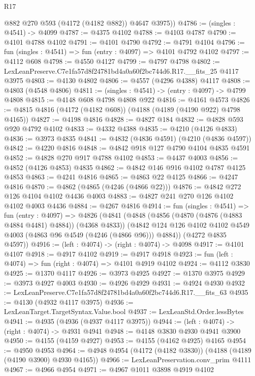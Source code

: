 \begin{lexlean}{R17}
\begin{coremodule}
        @882
        @270
        @593
        (@4172 (@4182 @882))
        @4647
        @3975))
@4786 := (singles : @4541) -> @4099
@4787 := @4375 @4102
@4788 := @4103 @4787
@4790 := @4101 @4788 @4102
@4791 := @4101 @4790
@4792 := @4791 @4104
@4796 := fun (singles : @4541) => fun (entry : @4097) => @4101 @4792 @4102
@4797 := @4112 @608
@4798 := @4550 @4127
@4799 := @4797 @4798
@4802 := LexLeanPreserve.C7e1fa57d8f24781bd4a0a60f2bc744d6.R17.__fits_25 @4117 @3975
@4803 := @4130 @4802
@4806 := @4557 (@4296 @4388) @4117
@4808 := @4803 (@4548 @4806)
@4811 := (singles : @4541) -> (entry : @4097) -> @4799 @4808
@4815 := @4148 @608 @4798 @4808 @922
@4816 := @4161 @4573
@4826 := @4815 @4816 (@4172 (@4182 @608)) (@4188 (@4189 (@4190 @922) @4798 @4165))
@4827 := @4198 @4816
@4828 := @4827 @184
@4832 := @4828 @593 @920 @4792 @4102
@4833 := @4332 @4388
@4835 := @4210 (@4126 @4833)
@4836 := @3973 @4835
@4841 := @4832 (@4836 @4591) (@4210 (@4836 @4597))
@4842 := @4220 @4816
@4848 := @4842 @918 @127 @4790 @4104 @4835 @4591
@4852 := @4828 @270 @917 @4788 @4102
@4853 := @4437 @4003
@4856 := @4852 (@4126 @4853) @4835
@4862 := @4842 @146 @916 @4102 @4787 @4125 @4853
@4863 := @4241 @4816
@4865 := @4863 @22 @4125
@4866 := @4247 @4816
@4870 := @4862 (@4865 (@4246 (@4866 @22)))
@4876 := @4842 @272 @126 @4104 @4102 @4436 @4003
@4883 := @4827 @241 @270 @126 @4102 @4102 @4003 @4436
@4884 := @4267 @4816
@4914 := fun (singles : @4541) =>
  fun (entry : @4097) =>
  @4826
    (@4841
      (@4848
        (@4856 (@4870 (@4876 (@4883 @4884 @4481) @4884)) (@4368 @4833))
        (@4842 @124 @126 @4102 @4102 @4549 @4003 (@4863 @96 @4549 (@4246 (@4866 @96))) @4884))
      (@4272 @4835 @4597))
@4916 := (left : @4074) -> (right : @4074) -> @4098
@4917 := @4101 @4107
@4918 := @4917 @4102
@4919 := @4917 @4918
@4923 := fun (left : @4074) => fun (right : @4074) => @4101 @4919 @4102
@4924 := @4112 @3830
@4925 := @1370 @4117
@4926 := @3973 @4925
@4927 := @1370 @3975
@4929 := @3973 @4927 @4003
@4930 := @4926 @4929
@4931 := @4924 @4930
@4932 := LexLeanPreserve.C7e1fa57d8f24781bd4a0a60f2bc744d6.R17.__fits_63
@4935 := @4130 (@4932 @4117 @3975)
@4936 := LexLeanTarget.TargetSyntax.Value.bool
@4937 := LexLeanStd.Order.lessBytes
@4941 := @4935 (@4936 (@4937 @4117 @3975))
@4944 := (left : @4074) -> (right : @4074) -> @4931 @4941
@4948 := @4148 @3830 @4930 @4941 @3900
@4950 := @4155 (@4159 @4927)
@4953 := @4155 (@4162 @4925) @4165
@4954 := @4950 @4953
@4964 := @4948 @4954 (@4172 (@4182 @3830)) (@4188 (@4189 (@4190 @3900) @4930 @4165))
@4966 := LexLeanPreservation.conv_prim @4111
@4967 := @4966 @4954
@4971 := @4967 @1011 @3898 @4919 @4102

\end{coremodule}
\end{lexlean}
